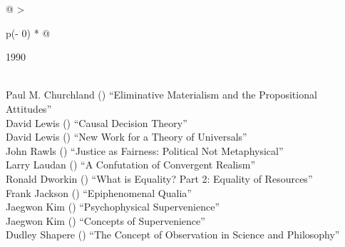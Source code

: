 \documentclass[
  10pt,
  letterpaper,
  DIV=11,
  numbers=noendperiod,
  twoside]{scrartcl}
\begin{document}
\begin{longtable}[]{@{}
  >{\raggedright\arraybackslash}p{(\columnwidth - 0\tabcolsep) * }@{}}

\caption{\label{tbl-top-ten-1981}Most cited articles published less than
ten years ago as of 1990.}

\tabularnewline

\toprule\noalign{}
\begin{minipage}[b]{\linewidth}\raggedright
1990
\end{minipage} \\
\midrule\noalign{}
\endhead
\bottomrule\noalign{}
\endlastfoot
Paul M. Churchland
()
``Eliminative Materialism and the Propositional Attitudes'' \\
David Lewis
()
``Causal Decision Theory'' \\
David Lewis
()
``New Work for a Theory of Universals'' \\
John Rawls
()
``Justice as Fairness: Political Not Metaphysical'' \\
Larry Laudan
()
``A Confutation of Convergent Realism'' \\
Ronald Dworkin
()
``What is Equality? Part 2: Equality of Resources'' \\
Frank Jackson
()
``Epiphenomenal Qualia'' \\
Jaegwon Kim
()
``Psychophysical Supervenience'' \\
Jaegwon Kim
()
``Concepts of Supervenience'' \\
Dudley Shapere
()
``The Concept of Observation in Science and Philosophy'' \\

\end{longtable}
\end{document}
